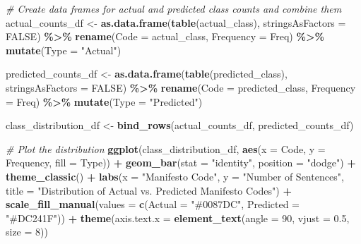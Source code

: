 \documentclass[
]{book}
\newenvironment{Shaded}{\begin{snugshade}}{\end{snugshade}}
\newcommand{\AttributeTok}[1]{\textcolor[rgb]{0.13,0.29,0.53}{#1}}
\newcommand{\CommentTok}[1]{\textcolor[rgb]{0.56,0.35,0.01}{\textit{#1}}}
\newcommand{\ConstantTok}[1]{\textcolor[rgb]{0.56,0.35,0.01}{#1}}
\newcommand{\DecValTok}[1]{\textcolor[rgb]{0.00,0.00,0.81}{#1}}
\newcommand{\FloatTok}[1]{\textcolor[rgb]{0.00,0.00,0.81}{#1}}
\newcommand{\FunctionTok}[1]{\textcolor[rgb]{0.13,0.29,0.53}{\textbf{#1}}}
\newcommand{\NormalTok}[1]{#1}
\newcommand{\OtherTok}[1]{\textcolor[rgb]{0.56,0.35,0.01}{#1}}
\newcommand{\SpecialCharTok}[1]{\textcolor[rgb]{0.81,0.36,0.00}{\textbf{#1}}}
\newcommand{\StringTok}[1]{\textcolor[rgb]{0.31,0.60,0.02}{#1}}
\begin{document}
\begin{Shaded}
\begin{Highlighting}[]
\CommentTok{\# Create data frames for actual and predicted class counts and combine them}
\NormalTok{actual\_counts\_df }\OtherTok{\textless{}{-}} \FunctionTok{as.data.frame}\NormalTok{(}\FunctionTok{table}\NormalTok{(actual\_class), }\AttributeTok{stringsAsFactors =} \ConstantTok{FALSE}\NormalTok{) }\SpecialCharTok{\%\textgreater{}\%}
    \FunctionTok{rename}\NormalTok{(}\AttributeTok{Code =}\NormalTok{ actual\_class, }\AttributeTok{Frequency =}\NormalTok{ Freq) }\SpecialCharTok{\%\textgreater{}\%}
    \FunctionTok{mutate}\NormalTok{(}\AttributeTok{Type =} \StringTok{"Actual"}\NormalTok{)}

\NormalTok{predicted\_counts\_df }\OtherTok{\textless{}{-}} \FunctionTok{as.data.frame}\NormalTok{(}\FunctionTok{table}\NormalTok{(predicted\_class), }\AttributeTok{stringsAsFactors =} \ConstantTok{FALSE}\NormalTok{) }\SpecialCharTok{\%\textgreater{}\%}
    \FunctionTok{rename}\NormalTok{(}\AttributeTok{Code =}\NormalTok{ predicted\_class, }\AttributeTok{Frequency =}\NormalTok{ Freq) }\SpecialCharTok{\%\textgreater{}\%}
    \FunctionTok{mutate}\NormalTok{(}\AttributeTok{Type =} \StringTok{"Predicted"}\NormalTok{)}

\NormalTok{class\_distribution\_df }\OtherTok{\textless{}{-}} \FunctionTok{bind\_rows}\NormalTok{(actual\_counts\_df, predicted\_counts\_df)}

\CommentTok{\# Plot the distribution}
\FunctionTok{ggplot}\NormalTok{(class\_distribution\_df, }\FunctionTok{aes}\NormalTok{(}\AttributeTok{x =}\NormalTok{ Code, }\AttributeTok{y =}\NormalTok{ Frequency, }\AttributeTok{fill =}\NormalTok{ Type)) }\SpecialCharTok{+} \FunctionTok{geom\_bar}\NormalTok{(}\AttributeTok{stat =} \StringTok{"identity"}\NormalTok{,}
    \AttributeTok{position =} \StringTok{"dodge"}\NormalTok{) }\SpecialCharTok{+} \FunctionTok{theme\_classic}\NormalTok{() }\SpecialCharTok{+} \FunctionTok{labs}\NormalTok{(}\AttributeTok{x =} \StringTok{"Manifesto Code"}\NormalTok{, }\AttributeTok{y =} \StringTok{"Number of Sentences"}\NormalTok{,}
    \AttributeTok{title =} \StringTok{"Distribution of Actual vs. Predicted Manifesto Codes"}\NormalTok{) }\SpecialCharTok{+} \FunctionTok{scale\_fill\_manual}\NormalTok{(}\AttributeTok{values =} \FunctionTok{c}\NormalTok{(}\AttributeTok{Actual =} \StringTok{"\#0087DC"}\NormalTok{,}
    \AttributeTok{Predicted =} \StringTok{"\#DC241F"}\NormalTok{)) }\SpecialCharTok{+} \FunctionTok{theme}\NormalTok{(}\AttributeTok{axis.text.x =} \FunctionTok{element\_text}\NormalTok{(}\AttributeTok{angle =} \DecValTok{90}\NormalTok{, }\AttributeTok{vjust =} \FloatTok{0.5}\NormalTok{,}
    \AttributeTok{size =} \DecValTok{8}\NormalTok{))}
\end{Highlighting}
\end{Shaded}
\end{document}
